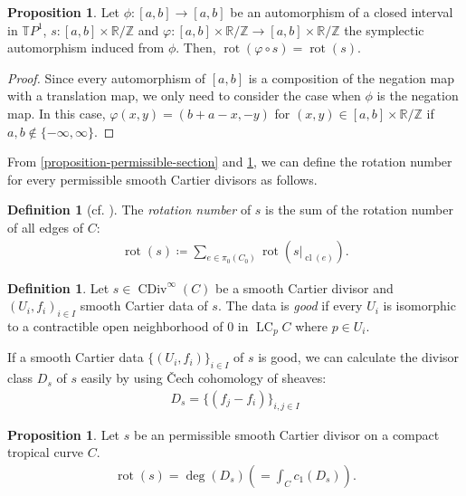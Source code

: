 \documentclass[a4paper,dvipdfmx,reqno,12pt]{amsart}
\theoremstyle{definition}
\newtheorem{definition}[theorem]{Definition}
\newtheorem{proposition}[theorem]{Proposition}
\newcommand{\deq}{\coloneqq}
\newcommand{\opn}[1]{\operatorname{#1}}
\numberwithin{equation}{section}
\begin{document}
\begin{proposition} \label{proposition-rotation-number}
Let 
$\phi \colon [a,b] \to [a,b]$ be an automorphism of 
a closed interval in $\mathbb{T}P^{1}$, 
$s\colon [a,b]\times \mathbb{R}/\mathbb{Z}$ and 
$\varphi \colon [a,b]\times \mathbb{R}/\mathbb{Z} \to 
[a,b]\times \mathbb{R}/\mathbb{Z}$ 
the symplectic automorphism induced from $\phi$.
Then, $\opn{rot}(\varphi\circ s)=\opn{rot}(s)$.
\end{proposition}
\begin{proof}
Since every automorphism of 
$[a,b]$ is a composition of the negation map 
with a translation map, we only need to consider the case
when $\phi$ is the negation map.
In this case, $\varphi(x,y)=(b+a-x,-y)$ for 
$(x,y)\in [a,b]\times \mathbb{R}/\mathbb{Z}$ if 
$a,b\notin \{-\infty,\infty\}$.
\end{proof}


From \cref{proposition-permissible-section} and \cref{proposition-rotation-number}, we can define the 
rotation number for every permissible smooth 
Cartier divisors as follows.
\begin{definition}[{cf. \cite{auroux2022lagrangian}}]
The \emph{rotation number} of $s$ is the sum of
the rotation number of all edges of $C$: 
\begin{align}
\opn{rot}(s)\deq \sum_{e\in \pi_0(C_0)}
\opn{rot}(s|_{\opn{cl}(e)}).
\end{align}

\end{definition}

\begin{definition}
Let $s\in \opn{CDiv}^{\infty}(C)$ be a smooth Cartier
divisor and $(U_i,f_i)_{i\in I}$ smooth Cartier data
of $s$. The data is \emph{good} if 
every $U_i$ is isomorphic to a contractible open 
neighborhood of $0$ in $\opn{LC}_{p}C$ where 
$p\in U_i$.
\end{definition}
If a smooth Cartier data $\{(U_i,f_i)\}_{i\in I}$ of $s$ 
is good,
we can calculate the divisor class $D_s$ of $s$ easily
by using \v{C}ech cohomology of sheaves:
\begin{align}
D_s=\{(f_j-f_i)\}_{i,j\in I}
\end{align}

\begin{proposition}
Let $s$ be an permissible smooth Cartier divisor on
a compact tropical curve $C$.
\label{equation-rotation-number}
\begin{align}
\opn{rot}(s)=\opn{deg}(D_s)(=\int_{C} c_1(D_s)).
\end{align}
\end{proposition}
\end{document}
